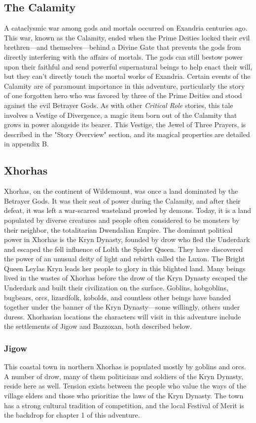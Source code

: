 \documentclass[10pt,a4,twoside,twocolumn,openany,nodeprecatedcode]{dndbook}
\begin{document}
\subsection{The Calamity}
A cataclysmic war among gods and mortals occurred on Exandria centuries ago. This war, known as the Calamity, ended when the Prime Deities locked their evil brethren—and themselves—behind a Divine Gate that prevents the gods from directly interfering with the affairs of mortals. The gods can still bestow power upon their faithful and send powerful supernatural beings to help enact their will, but they can't directly touch the mortal works of Exandria.
Certain events of the Calamity are of paramount importance in this adventure, particularly the story of one forgotten hero who was favored by three of the Prime Deities and stood against the evil Betrayer Gods. As with other \textit{Critical Role} stories, this tale involves a Vestige of Divergence, a magic item born out of the Calamity that grows in power alongside its bearer. This Vestige, the Jewel of Three Prayers, is described in the "Story Overview" section, and its magical properties are detailed in appendix B.
\subsection{Xhorhas}
Xhorhas, on the continent of Wildemount, was once a land dominated by the Betrayer Gods. It was their seat of power during the Calamity, and after their defeat, it was left a war-scarred wasteland prowled by demons. Today, it is a land populated by diverse creatures and people often considered to be monsters by their neighbor, the totalitarian Dwendalian Empire. The dominant political power in Xhorhas is the Kryn Dynasty, founded by drow who fled the Underdark and escaped the fell influence of Lolth the Spider Queen. They have discovered the power of an unusual deity of light and rebirth called the Luxon. The Bright Queen Leylas Kryn leads her people to glory in this blighted land.
Many beings lived in the wastes of Xhorhas before the drow of the Kryn Dynasty escaped the Underdark and built their civilization on the surface. Goblins, hobgoblins, bugbears, orcs, lizardfolk, kobolds, and countless other beings have banded together under the banner of the Kryn Dynasty—some willingly, others under duress.
Xhorhasian locations the characters will visit in this adventure include the settlements of Jigow and Bazzoxan, both described below.
\subsubsection{Jigow}
This coastal town in northern Xhorhas is populated mostly by goblins and orcs. A number of drow, many of them politicians and soldiers of the Kryn Dynasty, reside here as well. Tension exists between the people who value the ways of the village elders and those who prioritize the laws of the Kryn Dynasty. The town has a strong cultural tradition of competition, and the local Festival of Merit is the backdrop for chapter 1 of this adventure.
\end{document}
